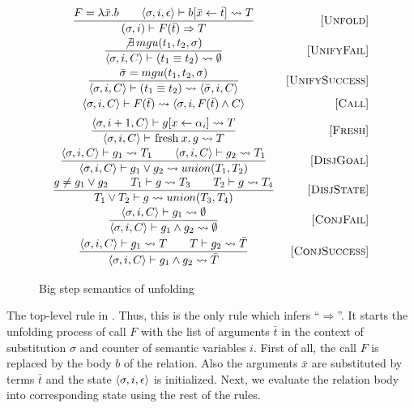 \begin{figure}[h!]
\[\begin{array}{cr}

\dfrac{ F = \lambda \bar{x}. b \qquad \inbr{\sigma, i, \epsilon} \vdash b[\bar{x} \leftarrow \bar{t}] \leadsto T}
      {(\sigma, i) \vdash F(\bar{t}) \Rightarrow T}
&     \ruleno{Unfold} \\[3mm]
\dfrac{\not\exists \, mgu(t_1, t_2, \sigma)}
      {\inbr{\sigma, i, C} \vdash (t_1 \equiv t_2) \leadsto \emptyset}
&     \ruleno{UnifyFail}  \\[3mm]
\dfrac{\bar\sigma = mgu(t_1, t_2, \sigma)}
      {\inbr{\sigma, i, C} \vdash (t_1 \equiv t_2) \leadsto \inbr{\bar\sigma, i, C}}
&     \ruleno{UnifySuccess}  \\[3mm]
      {\inbr{\sigma, i, C} \vdash F(\bar{t}) \leadsto \inbr{ \sigma, i, F(\bar{t}) \land C}}
&     \ruleno{Call} \\[2mm]
\dfrac{\inbr{\sigma, i+1, C} \vdash g[x \leftarrow \alpha_i] \leadsto T}
      {\inbr{\sigma, i, C} \vdash \mbox{\lstinline|fresh|} \, x. \, g \leadsto T}
&     \ruleno{Fresh}  \\[3mm]
\dfrac{\inbr{\sigma, i, C} \vdash g_1 \leadsto T_1 \qquad \inbr{\sigma, i, C} \vdash g_2 \leadsto T_1}
      {\inbr{\sigma, i, C} \vdash g_1 \lor g_2 \leadsto union(T_1, T_2)}
&     \ruleno{DisjGoal}  \\[3mm]
\dfrac{g \not= g_1 \lor g_2 \qquad T_1 \vdash g \leadsto T_3 \qquad T_2 \vdash g \leadsto T_4}
      {T_1 \lor T_2 \vdash g \leadsto union(T_3, T_4)}
&     \ruleno{DisjState}  \\[3mm]
\dfrac{\inbr{\sigma, i, C} \vdash g_1 \leadsto \emptyset}
      {\inbr{\sigma, i, C} \vdash g_1 \land g_2 \leadsto \emptyset}
&     \ruleno{ConjFail}  \\[3mm]
\dfrac{\inbr{\sigma, i, C} \vdash g_1 \leadsto T \qquad T \vdash g_2 \leadsto \bar{T}}
      {\inbr{\sigma, i, C} \vdash g_1 \land g_2 \leadsto \bar{T}}
&     \ruleno{ConjSuccess}  \\[3mm]
\end{array}\]

\caption{Big step semantics of unfolding}
\label{fair:unfolding-semantics}
\end{figure}

The top-level rule in . Thus, this is the only rule which infers ``$\Rightarrow$''. It starts the unfolding process of call $F$
with the list of arguments $\bar{t}$ in the context of substitution $\sigma$ and counter of semantic variables $i$.
First of all, the call $F$ is replaced by the body $b$ of the relation. Also the arguments $\bar{x}$ are substituted by terms $\bar{t}$ and
the state $\langle \sigma, i, \epsilon \rangle$ is initialized. Next, we evaluate the relation body into corresponding state using the rest of the rules.


